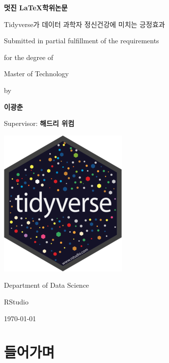 \documentclass[a4]{article}
\begin{document}
\begin{titlepage}	
	\centering 	
	{\LARGE \bfseries 멋진 \LaTeX 학위논문}
	\vspace{3\baselineskip}
	
	{\Large Tidyverse가 데이터 과학자 정신건강에 미치는 긍정효과}
	\vspace{3.5\baselineskip}
	
	{\Large Submitted in partial fulfillment of the requirements     \vspace{0.5\baselineskip}
		
		for the degree of  }
	\vspace{3.5\baselineskip}
	
	{\Large Master of Technology}
	\vspace{0.5\baselineskip}
	
	{\Large by}
	\vspace{0.5\baselineskip}
	
	{\Large \bfseries 이광춘}
	\vspace{3\baselineskip}
	
	{\Large Supervisor: \bfseries 해드리 위컴}
	\vspace{3.5\baselineskip}
	
	\includegraphics[width=0.1\linewidth]{tidyverse}
	\vspace{3.5\baselineskip}
	
	{\Large Department of Data Science}
	\vspace{0.5\baselineskip}
	
	{\Large RStudio}
	\vspace{3.5\baselineskip}
	
	{\Large \today}    
	
\end{titlepage}		

\begin{abstract}
 	\jiwon[1]
\end{abstract}

\section{들어가며}
	\jiwon
\end{document}
